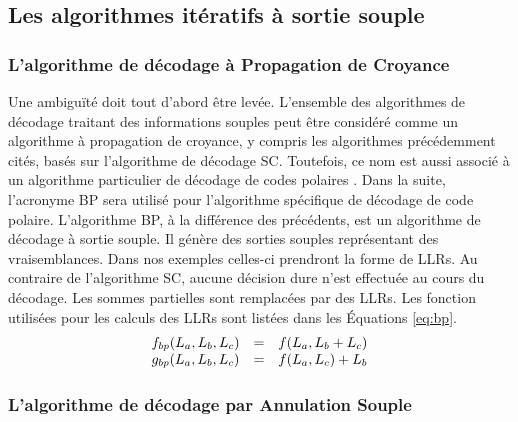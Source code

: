 \subsection{Les algorithmes itératifs à sortie souple}


\subsubsection{L'algorithme de décodage à Propagation de Croyance}
Une ambiguïté doit tout d'abord être levée. L'ensemble des algorithmes de décodage traitant des informations souples peut être considéré comme un algorithme à propagation de croyance, y compris les algorithmes précédemment cités, basés sur l'algorithme de décodage SC. Toutefois, ce nom est aussi associé à un algorithme particulier de décodage de codes polaires \cite{arikan_channel_2009}. Dans la suite, l'acronyme BP sera utilisé pour l'algorithme spécifique de décodage de code polaire. L'algorithme BP, à la différence des précédents, est un algorithme de décodage à sortie souple. Il génère des sorties souples représentant des vraisemblances. Dans nos exemples celles-ci prendront la forme de LLRs. Au contraire de l'algorithme SC, aucune décision dure n'est effectuée au cours du décodage. Les sommes partielles sont remplacées par des LLRs. Les fonction utilisées pour les calculs des LLRs sont listées dans les Équations \ref{eq:bp}.
    \begin{eqnarray}
      \begin{array}{l c l}
        f_{bp}(L_a,L_b,L_c) & = & f(L_a, L_b  + L_c) \\
        g_{bp}(L_a,L_b,L_c) & = & f(L_a, L_c) + L_b
      \end{array}
      \label{eq:bp}
    \end{eqnarray}

\subsubsection{L'algorithme de décodage par Annulation Souple}

